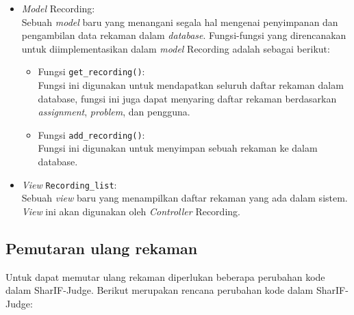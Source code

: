 \begin{itemize}
    \item \textit{Model} Recording: \\
          Sebuah \textit{model} baru yang menangani segala hal mengenai penyimpanan dan pengambilan data rekaman dalam \textit{database}. Fungsi-fungsi yang direncanakan untuk diimplementasikan dalam \textit{model} Recording adalah sebagai berikut:
          \begin{itemize}
              \item Fungsi \verb|get_recording()|: \\
                    Fungsi ini digunakan untuk mendapatkan seluruh daftar rekaman dalam database, fungsi ini juga dapat menyaring daftar rekaman berdasarkan \textit{assignment}, \textit{problem}, dan pengguna.
              \item Fungsi \verb|add_recording()|: \\
                    Fungsi ini digunakan untuk menyimpan sebuah rekaman ke dalam database.
          \end{itemize}
    \item \textit{View} \verb|Recording_list|: \\
          Sebuah \textit{view} baru yang menampilkan daftar rekaman yang ada dalam sistem. \textit{View} ini akan digunakan oleh \textit{Controller} Recording.
\end{itemize}

\subsection{Pemutaran ulang rekaman}

Untuk dapat memutar ulang rekaman diperlukan beberapa perubahan kode dalam SharIF-Judge. Berikut merupakan rencana perubahan kode dalam SharIF-Judge:

